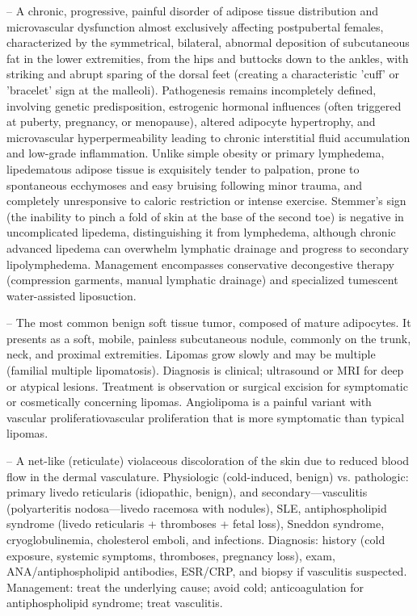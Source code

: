 -- A chronic, progressive, painful disorder of adipose tissue distribution and microvascular dysfunction almost exclusively affecting postpubertal females, characterized by the symmetrical, bilateral, abnormal deposition of subcutaneous fat in the lower extremities, from the hips and buttocks down to the ankles, with striking and abrupt sparing of the dorsal feet (creating a characteristic 'cuff' or 'bracelet' sign at the malleoli). Pathogenesis remains incompletely defined, involving genetic predisposition, estrogenic hormonal influences (often triggered at puberty, pregnancy, or menopause), altered adipocyte hypertrophy, and microvascular hyperpermeability leading to chronic interstitial fluid accumulation and low-grade inflammation. Unlike simple obesity or primary lymphedema, lipedematous adipose tissue is exquisitely tender to palpation, prone to spontaneous ecchymoses and easy bruising following minor trauma, and completely unresponsive to caloric restriction or intense exercise. Stemmer's sign (the inability to pinch a fold of skin at the base of the second toe) is negative in uncomplicated lipedema, distinguishing it from lymphedema, although chronic advanced lipedema can overwhelm lymphatic drainage and progress to secondary lipolymphedema. Management encompasses conservative decongestive therapy (compression garments, manual lymphatic drainage) and specialized tumescent water-assisted liposuction.

-- The most common benign soft tissue tumor, composed of mature adipocytes. It presents as a soft, mobile, painless subcutaneous nodule, commonly on the trunk, neck, and proximal extremities. Lipomas grow slowly and may be multiple (familial multiple lipomatosis). Diagnosis is clinical; ultrasound or MRI for deep or atypical lesions. Treatment is observation or surgical excision for symptomatic or cosmetically concerning lipomas. Angiolipoma is a painful variant with vascular proliferatiovascular proliferation that is more symptomatic than typical lipomas.

-- A net-like (reticulate) violaceous discoloration of the skin due to reduced blood flow in the dermal vasculature. Physiologic (cold-induced, benign) vs. pathologic: primary livedo reticularis (idiopathic, benign), and secondary—vasculitis (polyarteritis nodosa—livedo racemosa with nodules), SLE, antiphospholipid syndrome (livedo reticularis + thromboses + fetal loss), Sneddon syndrome, cryoglobulinemia, cholesterol emboli, and infections. Diagnosis: history (cold exposure, systemic symptoms, thromboses, pregnancy loss), exam, ANA/antiphospholipid antibodies, ESR/CRP, and biopsy if vasculitis suspected. Management: treat the underlying cause; avoid cold; anticoagulation for antiphospholipid syndrome; treat vasculitis.

